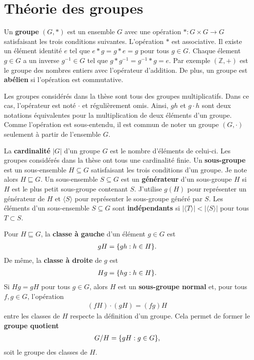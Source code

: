 \chapter{Théorie des groupes}
\label{chap:theo_groupes}

Un \textbf{groupe} $(G, *)$ est un ensemble $G$ avec une opération $* : G \times G \to G$
satisfaisant les trois conditions suivantes.
L'opération $*$ est associative.
Il existe un élément identité $e$ tel que $e * g = g * e = g$ pour tous $g \in G$.
Chaque élement $g \in G$ a un inverse $g^{-1} \in G$ tel que $g * g^{-1} = g^{-1} * g = e$.
Par exemple $(\mathbb Z, +)$ est le groupe des nombres entiers avec l'opérateur d'addition.
De plus, un groupe est \textbf{abélien} si l'opération est commutative.

Les groupes considérés dans la thèse sont tous des groupes multiplicatifs.
Dans ce cas, l'opérateur est noté $\cdot$ et régulièrement omis.
Ainsi, $gh$ et $g \cdot h$ sont deux notations équivalentes pour la multiplication 
de deux éléments d'un groupe.
Comme l'opération est sous-entendu,
il est commun de noter un groupe $(G, \cdot)$ seulement à partir de l'ensemble $G$.

La \textbf{cardinalité} $|G|$ d'un groupe $G$ est le nombre d'éléments de celui-ci.
Les groupes considérés dans la thèse ont tous une cardinalité finie.
Un \textbf{sous-groupe} est un sous-ensemble $H \subseteq G$ satisfaisant les trois conditions
d'un groupe.
Je note alors $H \sqsubseteq G$.
Un sous-ensemble $S \subseteq G$ est un \textbf{générateur} d'un sous-groupe $H$ si $H$ est le plus petit
sous-groupe contenant $S$.
J'utilise $g(H)$ pour représenter un générateur de $H$ 
et $\langle S \rangle$ pour représenter le sous-groupe généré par $S$.
Les éléments d'un sous-ensemble $S \subseteq G$ sont \textbf{indépendants} si 
$|\langle T \rangle| < |\langle S \rangle|$ pour tous $T \subset S$.

Pour $H \sqsubseteq G$,
la \textbf{classe à gauche} d'un élément $g \in G$ est
\begin{align}
  gH = \qty{gh : h \in H}.
\end{align}
De même,
la \textbf{classe à droite} de $g$ est 
\begin{align}
  Hg = \qty{hg : h \in H}.
\end{align}
Si $Hg = gH$ pour tous $g \in G$,
alors $H$ est un \textbf{sous-groupe normal} et,
pour tous $f, g \in G$, l'opération
\begin{align}
  (fH)\cdot(gH) = (fg)H
\end{align}
entre les classes de $H$ respecte la définition d'un groupe.
Cela permet de former le \textbf{groupe quotient} 
\begin{align}
  G / H = \qty{gH : g \in G},
\end{align}
soit le groupe des classes de $H$.

